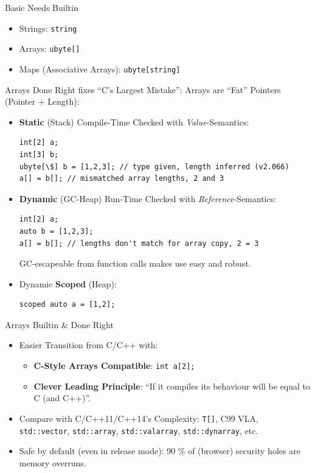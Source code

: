 \documentclass[xcolor=dvipsnames]{beamer}
\begin{document}
\begin{frame}[fragile]{Basic Needs Builtin}
  \begin{itemize}[<+->]
  \item Strings: \texttt{string}
  \item Arrays: \texttt{ubyte[]}
  \item Maps (Associative Arrays): \texttt{ubyte[string]}
  \end{itemize}
\end{frame}

\begin{frame}[fragile]{Arrays Done Right fixes ``C's Largest Mistake'': }
  Arrays are ``Fat'' Pointers (Pointer + Length):
\pause
  \begin{itemize}[<+->]
  \item \textbf{Static} (Stack) Compile-Time Checked with \textit{Value}-Semantics:\\
    \begin{lstlisting}[frame=single]
int[2] a;
int[3] b;
ubyte[\$] b = [1,2,3]; // type given, length inferred (v2.066)
a[] = b[]; // mismatched array lengths, 2 and 3
    \end{lstlisting}
  \item \textbf{Dynamic} (GC-Heap) Run-Time Checked with \textit{Reference}-Semantics:\\
    \begin{lstlisting}[frame=single]
int[2] a;
auto b = [1,2,3];
a[] = b[]; // lengths don't match for array copy, 2 = 3
    \end{lstlisting}
    GC-escapeable from function calls makes use easy and robust.
  \item Dynamic \textbf{Scoped} (Heap):\\
    \begin{lstlisting}[frame=single]
scoped auto a = [1,2];
    \end{lstlisting}
\end{itemize}
\end{frame}

\begin{frame}[fragile]{Arrays Builtin \& Done Right}
  \begin{itemize}[<+->]
  \item Easier Transition from C/C++ with:
    \begin{itemize}[<+->]
    \item \textbf{C-Style Arrays Compatible}: \texttt{int a[2];}
    \item \textbf{Clever Leading Principle}: ``If it compiles its behaviour will be
      equal to C (and C++)''.
    \end{itemize}
  \item Compare with C/C++11/C++14’s Complexity: \texttt{T[]}, C99 VLA,
    \texttt{std::vector}, \texttt{std::array}, \texttt{std::valarray},
    \texttt{std::dynarray}, etc.
  \item Safe by default (even in release mode): 90 \% of (browser) security
    holes are memory overruns.
  \end{itemize}
\end{frame}
\end{document}
